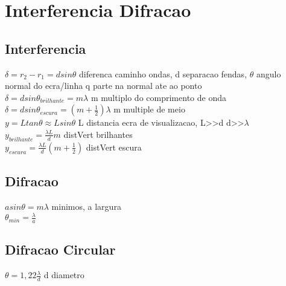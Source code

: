 \section{Interferencia Difracao}
\subsection{Interferencia}
$\delta =r_2-r_1=dsin\theta $ diferenca caminho ondas, d separacao fendas, $\theta$ angulo normal do ecra/linha q parte na normal ate ao ponto\\
$\delta =dsin\theta _{brilhante}=m\lambda $ m multiplo do comprimento de onda\\
$\delta =dsin\theta _{escura}=\left(m+\frac{1}{2}\right)\lambda $ m multiple de meio\\
$y=Ltan\theta \approx Lsin\theta $ L distancia ecra de visualizacao, L>>d d>>$\lambda$\\
$y_{brilhante}=\frac{\lambda L}{d}m$ distVert brilhantes\\
$y_{escura}=\frac{\lambda L}{d}\left(m+\frac{1}{2}\right)$ distVert escura\\
\subsection{Difracao}
$asin\theta =m\lambda $ minimos, a largura\\
$\theta _{min}=\frac{\lambda }{a}$\\
\subsection{Difracao Circular}
$\theta =1,22\frac{\lambda }{d}$ d diametro\\